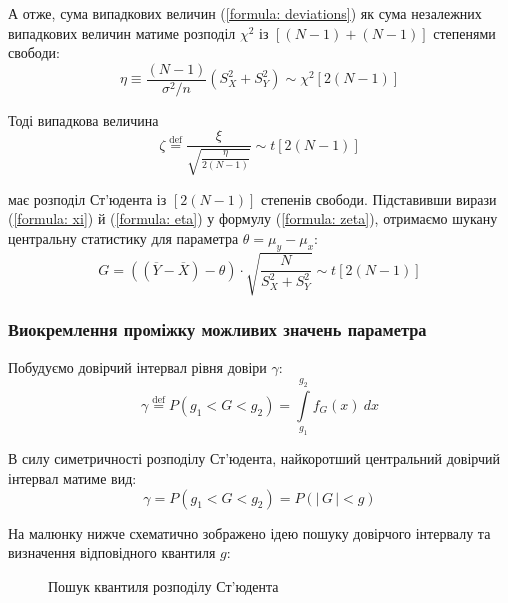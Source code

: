 А отже, сума випадкових величин (\ref{formula: deviations}) як сума незалежних випадкових величин матиме 
розподіл $\chi^2$ із $\left[ (N-1)+(N-1) \right]$ степенями свободи:
\begin{equation}
    \eta \equiv \frac{(N-1)}{\sigma^2/n}\left( S_X^2+S_Y^2 \right)\sim \chi^2\left[ 2(N-1) \right] \label{formula: eta}
\end{equation}

Тоді випадкова величина
\begin{equation}
    \zeta \overset{\mathrm{def}}{=} \frac{\xi}{\sqrt{\frac{\eta}{2(N-1)}}} \sim t\left[ 2(N-1) \right] \label{formula: zeta}
\end{equation}

має розподіл Ст'юдента із $\left[ 2(N-1) \right]$ степенів свободи. Підставивши вирази (\ref{formula: xi}) й 
(\ref{formula: eta}) у формулу (\ref{formula: zeta}), отримаємо шукану центральну статистику для параметра 
$\theta=\mu_y-\mu_x:$
\begin{equation}
    G=\left((\overline{Y}-\overline{X})-\theta\right)\cdot 
    \sqrt{\frac{N}{S_X^2+S_Y^2}}
    \sim t\left[ 2(N-1) \right] \label{formula: G central statistic}
\end{equation}

\subsubsection{Виокремлення проміжку можливих значень параметра}

Побудуємо довірчий інтервал рівня довіри $\gamma:$
\begin{equation*}
    \gamma \overset{\mathrm{def}}{=}P(g_1<G<g_2)=\int\limits_{g_1}^{g_2}f_G(x)\ dx
\end{equation*}

В силу симетричності розподілу Ст'юдента, найкоротший центральний довірчий інтервал матиме вид:
\begin{equation}
    \gamma = P(g_1<G<g_2)=P(|\, G\, |<g) \label{formula: gamma t interval}
\end{equation}

На малюнку нижче схематично зображено ідею пошуку довірчого інтервалу та визначення відповідного 
квантиля $g:$ 

\begin{figure}[H]
    \caption{Пошук квантиля розподілу Ст'юдента}
    \label{figure: t interval}
\end{figure}

